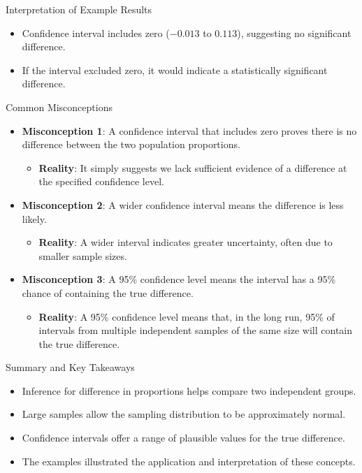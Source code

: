 \documentclass[handout]{beamer} %
\begin{document}
\begin{frame}{Interpretation of Example Results}
  \begin{itemize}
    \item Confidence interval includes zero ($-0.013$ to $0.113$), suggesting no significant difference.
    \item If the interval excluded zero, it would indicate a statistically significant difference.
  \end{itemize}
\end{frame}

\begin{frame}{Common Misconceptions}
  \begin{itemize}
    \item \textbf{Misconception 1}: A confidence interval that includes zero proves there is no difference between the two population proportions.
      \begin{itemize}
        \item \textbf{Reality}: It simply suggests we lack sufficient evidence of a difference at the specified confidence level.
      \end{itemize}
    \item \textbf{Misconception 2}: A wider confidence interval means the difference is less likely.
      \begin{itemize}
        \item \textbf{Reality}: A wider interval indicates greater uncertainty, often due to smaller sample sizes.
      \end{itemize}
    \item \textbf{Misconception 3}: A 95\% confidence level means the interval has a 95\% chance of containing the true difference.
      \begin{itemize}
        \item \textbf{Reality}: A 95\% confidence level means that, in the long run, 95\% of intervals from multiple independent samples of the same size will contain the true difference.
      \end{itemize}
  \end{itemize}
\end{frame}


\begin{frame}{Summary and Key Takeaways}
  \begin{itemize}
    \item Inference for difference in proportions helps compare two independent groups.
    \item Large samples allow the sampling distribution to be approximately normal.
    \item Confidence intervals offer a range of plausible values for the true difference.
    \item The examples illustrated the application and interpretation of these concepts.
  \end{itemize}
\end{frame}
\end{document}
